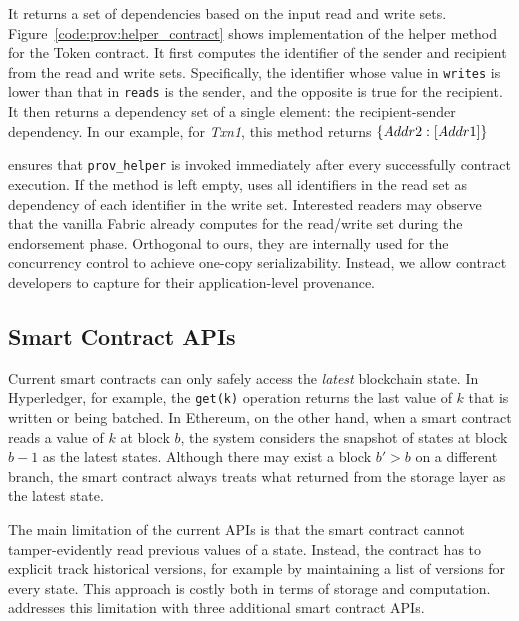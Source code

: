 It returns a set of dependencies based on the input read and write sets. Figure~\ref{code:prov:helper_contract}
shows implementation of the helper method for the Token contract. It first computes the identifier of the
sender and recipient from the read and write sets. Specifically, the identifier whose value in \texttt{writes} is lower than that
in \texttt{reads} is the sender, and the opposite is true for the recipient. It then returns a dependency set of
a single element: the recipient-sender dependency. In our example, for {\em Txn1}, this method returns
$\{{\textit Addr2}: [{\textit Addr1}]\}$ 

{\fs} ensures that \texttt{prov\_helper} is invoked immediately after every successfully contract execution.
If the method is left empty, {\fs} uses all identifiers in the read set as dependency of each identifier
in the write set. Interested readers may observe that the vanilla Fabric already computes for the read/write set
during the endorsement phase. 
Orthogonal to ours, they are internally used for the concurrency control to achieve one-copy serializability. 
Instead, we allow contract developers to capture for their application-level provenance. 


\subsection{Smart Contract APIs}
Current smart contracts can only safely access the {\em latest} blockchain state. In Hyperledger, for example, the \texttt{get(k)} operation returns the last value of $k$ that is written or being batched.  In Ethereum, on the other
hand, when a smart contract reads a value of $k$ at block $b$, the system considers the snapshot of states at
block $b-1$ as the latest states. Although there may exist a block $b' > b$ on a different branch, the
smart contract always treats what returned from the storage layer as the latest state.  

The main limitation of the current APIs is that the smart contract cannot tamper-evidently read previous values of a state.
Instead, the contract has to explicit track historical versions, for example by maintaining a list of versions
for every state. This approach is costly both in terms of storage and computation. {\fs} addresses this limitation with three additional smart contract APIs. 


